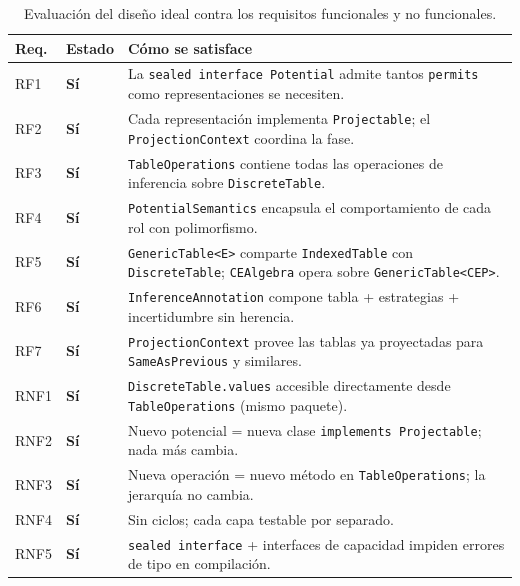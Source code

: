 \documentclass[11pt,a4paper]{article}
\newcommand{\code}[1]{\texttt{#1}}
\newcommand{\good}[1]{\textcolor{codegreen}{\textbf{#1}}}
\begin{document}
\begin{table}[H]
\centering
\small
\setlength{\tabcolsep}{4pt}
\begin{tabular}{llp{8cm}}
\toprule
\textbf{Req.} & \textbf{Estado} & \textbf{Cómo se satisface} \\
\midrule
\rowcolor{lightgray}
RF1 & \good{Sí} & La \code{sealed interface Potential} admite tantos
                    \code{permits} como representaciones se necesiten. \\
RF2 & \good{Sí} & Cada representación implementa \code{Projectable};
                    el \code{ProjectionContext} coordina la fase. \\
\rowcolor{lightgray}
RF3 & \good{Sí} & \code{TableOperations} contiene todas las operaciones
                    de inferencia sobre \code{DiscreteTable}. \\
RF4 & \good{Sí} & \code{PotentialSemantics} encapsula el comportamiento
                    de cada rol con polimorfismo. \\
\rowcolor{lightgray}
RF5 & \good{Sí} & \code{GenericTable<E>} comparte \code{IndexedTable}
                    con \code{DiscreteTable}; \code{CEAlgebra} opera
                    sobre \code{GenericTable<CEP>}. \\
RF6 & \good{Sí} & \code{InferenceAnnotation} compone tabla + estrategias
                    + incertidumbre sin herencia. \\
\rowcolor{lightgray}
RF7 & \good{Sí} & \code{ProjectionContext} provee las tablas ya proyectadas
                    para \code{SameAsPrevious} y similares. \\
\midrule
RNF1 & \good{Sí} & \code{DiscreteTable.values} accesible directamente
                     desde \code{TableOperations} (mismo paquete). \\
\rowcolor{lightgray}
RNF2 & \good{Sí} & Nuevo potencial = nueva clase \code{implements
                     Projectable}; nada más cambia. \\
RNF3 & \good{Sí} & Nueva operación = nuevo método en
                     \code{TableOperations}; la jerarquía no cambia. \\
\rowcolor{lightgray}
RNF4 & \good{Sí} & Sin ciclos; cada capa testable por separado. \\
RNF5 & \good{Sí} & \code{sealed interface} + interfaces de capacidad
                     impiden errores de tipo en compilación. \\
\bottomrule
\end{tabular}
\caption{Evaluación del diseño ideal contra los requisitos funcionales y
         no funcionales.}
\label{tab:ideal-eval-req}
\end{table}
\end{document}
